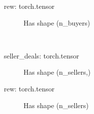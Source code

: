 \documentclass[letterpaper,10pt,english]{sphinxmanual}
\begin{document}
\begin{fulllineitems}
\begin{fulllineitems}
\begin{description}
\end{description}
\begin{description}
\item[{rew: torch.tensor}] \leavevmode
\sphinxAtStartPar
Has shape (n\_buyers)

\end{description}

\end{fulllineitems}


\begin{fulllineitems}
\label{\detokenize{MultiAgentMarketRL:reward_setting.NoDealPenaltyReward.seller_reward}}~\begin{description}
\item[{seller\_deals: torch.tensor}] \leavevmode
\sphinxAtStartPar
Has shape (n\_sellers,)

\end{description}
\begin{description}
\item[{rew: torch.tensor}] \leavevmode
\sphinxAtStartPar
Has shape (n\_sellers)

\end{description}

\end{fulllineitems}


\end{fulllineitems}

\end{document}
